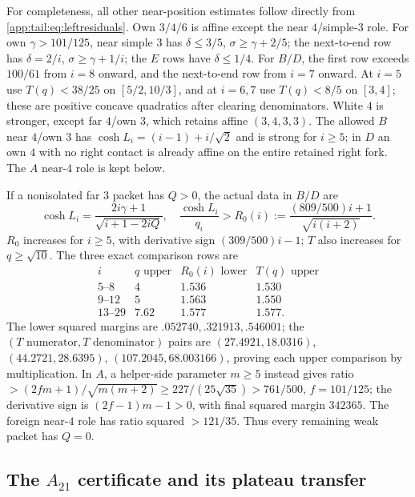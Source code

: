For completeness, all other near-position estimates follow directly
from \eqref{app:tail:eq:leftresiduals}. Own $3/4/6$ is affine except the
near $4$/simple-$3$ role. For own $\gamma>101/125$, near simple
$3$ has $\delta\le3/5$, $\sigma\ge\gamma+2/5$;
the next-to-end row has $\delta=2/i$, $\sigma\ge\gamma+1/i$;
the $E$ rows have $\delta\le1/4$.
For $B/D$, the first row exceeds $100/61$ from $i=8$ onward,
and the next-to-end row from $i=7$ onward. At $i=5$ use
$T(q)<38/25$ on $[5/2,10/3]$, and at $i=6,7$ use
$T(q)<8/5$ on $[3,4]$; these are positive concave quadratics
after clearing denominators. White $4$ is stronger, except far
$4$/own $3$, which retains affine $(3,4,3,3)$.
The allowed $B$ near $4$/own $3$ has
$\cosh L_i=(i-1)+i/\sqrt2$ and is strong for $i\ge5$;
in $D$ an own $4$ with no right contact is already affine on the
entire retained right fork. The $A$ near-$4$ role is kept below.

If a nonisolated far $3$ packet has $Q>0$, the actual data in $B/D$ are
\[
 \cosh L_i=\frac{2i\gamma+1}{\sqrt{i+1-2iQ}},\quad
 \frac{\cosh L_i}{q_i}>R_0(i)
 :=\frac{(809/500)i+1}{\sqrt{i(i+2)}}.
\]
$R_0$ increases for $i\ge5$, with derivative sign
$(309/500)i-1$; $T$ also increases for $q\ge\sqrt{10}$.
The three exact comparison rows are
\[
\begin{array}{c|c|c|c}
i&q\text{ upper}&R_0(i)\text{ lower}&T(q)\text{ upper}\\ \hline
5\text{--}8&4&1.536&1.530\\
9\text{--}12&5&1.563&1.550\\
13\text{--}29&7.62&1.577&1.577.
\end{array}
\]
The lower squared margins are $.052740,.321913,.546001$;
the $(T\text{ numerator},T\text{ denominator})$ pairs are
$(27.4921,18.0316)$, $(44.2721,28.6395)$,
$(107.2045,68.003166)$, proving each upper comparison by
multiplication. In $A$, a helper-side parameter $m\ge5$ instead
gives ratio $>(2fm+1)/\sqrt{m(m+2)}\ge227/(25\sqrt{35})>
761/500$, $f=101/125$; the derivative sign is
$(2f-1)m-1>0$, with final squared margin $342365$.
The foreign near-$4$ role has ratio squared $>121/35$.
Thus every remaining weak packet has $Q=0$.

\subsection{The \texorpdfstring{$A_{21}$}{A21} certificate and its plateau transfer}
\label{app:tail:sec:Acap}

